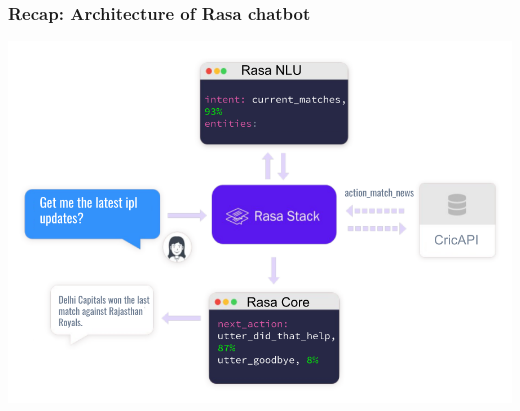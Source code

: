  \begin{frame}[fragile]\frametitle{Recap: Architecture of Rasa chatbot}

\begin{center}
\includegraphics[width=\linewidth,keepaspectratio]{images/rasa_full4.png}
\end{center}

\end{frame}




